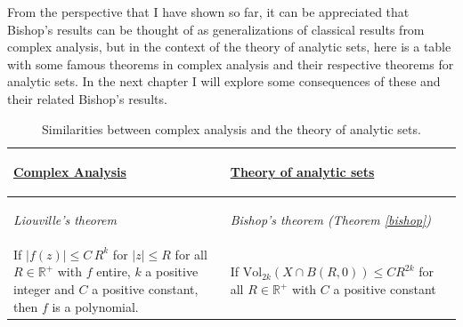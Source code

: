 \documentclass[12pt,twoside,a4paper]{report}
\newcommand{\re}{\ensuremath{\mathbb R }}
\begin{document}
  \noindent From the perspective that I have shown so far, it can be appreciated that Bishop's results can be thought of as generalizations of classical results from complex analysis, but in the context of the theory of analytic sets, here is a table with some famous theorems in complex analysis and their respective theorems for analytic sets. In the next chapter I will explore some consequences of these and their related Bishop's results.

  \begin{table}[h!]
          \caption{Similarities between complex analysis and the theory of analytic sets.}\label{table_complex_analysis}
          \centering
          \begin{tabular}{| m{5cm} | m{5cm} |}
                              \toprule
                              \begin{center} %
                                      \underline{\textbf{Complex Analysis}}
                              \end{center} &
                              \begin{center} %
                                      \underline{\textbf{Theory of analytic sets}}
                              \end{center} \\
                              \midrule
                              \begin{center}
                                      \textit{Liouville's theorem}
                              \end{center} &
                              \begin{center}
                                      \textit{Bishop's theorem (Theorem \ref{bishop})}
                              \end{center}\\
                              \midrule
                                  If $\vert f(z)\vert\leq C\,R^k$ for $\vert z\vert\leq R$ for all $R\in\re^{+}$ with $f$
                                  entire, $k$ a positive integer and $C$ a positive constant, then $f$ is a polynomial.
                                          &
                                  If $\textrm{Vol}_{2k}(X\cap B(R,0))\leq CR^{2k}$ for all $R\in\re^{+}$ with $C$ a positive constant

\end{tabular}
\end{table}
\end{document}
